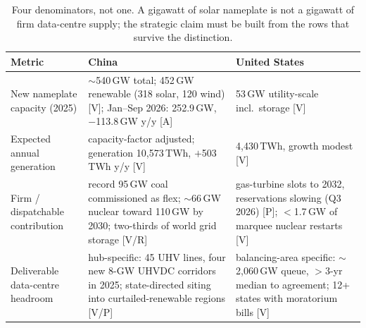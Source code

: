 \begin{table}[htbp]
  \centering
  \small
  \caption{Four denominators, not one. A gigawatt of solar nameplate is not a gigawatt of firm data-centre supply; the strategic claim must be built from the rows that survive the distinction.}
  \label{tab:firmpower}
  \begin{tabular}{p{40mm}p{50mm}p{52mm}}
    \toprule
    Metric & China & United States \\
    \midrule
    New nameplate capacity (2025) & $\sim$540\,GW total; 452\,GW renewable (318 solar, 120 wind) [V]; Jan--Sep 2026: 252.9\,GW, $-$113.8\,GW y/y [A] & 53\,GW utility-scale incl.\ storage [V] \\
    \addlinespace
    Expected annual generation & capacity-factor adjusted; generation 10,573\,TWh, $+$503\,TWh y/y [V] & 4,430\,TWh, growth modest [V] \\
    \addlinespace
    Firm / dispatchable contribution & record 95\,GW coal commissioned as flex; $\sim$66\,GW nuclear toward 110\,GW by 2030; two-thirds of world grid storage [V/R] & gas-turbine slots to 2032, reservations slowing (Q3 2026) [P]; $<$1.7\,GW of marquee nuclear restarts [V] \\
    \addlinespace
    Deliverable data-centre headroom & hub-specific: 45 UHV lines, four new 8-GW UHVDC corridors in 2025; state-directed siting into curtailed-renewable regions [V/P] & balancing-area specific: $\sim$2,060\,GW queue, $>$3-yr median to agreement; 12+ states with moratorium bills [V] \\
    \bottomrule
  \end{tabular}
\end{table}

